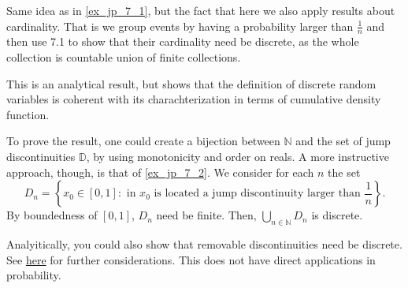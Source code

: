 \begin{my_ex}
	
\end{my_ex}
\begin{my_remark}
	\label{ex_jp_7_2}
	Same idea as in \ref{ex_jp_7_1}, but the fact that here we also apply results about cardinality. That is we group events by having a probability larger than $\frac{1}{n}$ and then use 7.1 to show that their cardinality need be discrete, as the whole collection is countable union of finite collections.
\end{my_remark}

\begin{my_ex}
	
\end{my_ex}
\begin{my_remark}
	This is an analytical result, but shows that the definition of discrete random variables is coherent with its charachterization in terms of cumulative density function. 
	
	To prove the result, one could create a bijection between $\mathbb{N}$ and the set of jump discontinuities $\mathbb{D}$, by using monotonicity and order on reals.
	A more instructive approach, though, is that of \ref{ex_jp_7_2}. We consider for each $n$ the set
	\[ 
		D_n = 
		\left\{
			x_0 \in [0,1] : 
			\text{ in } x_0 \text{ is located a jump discontinuity larger than } 
			\frac{1}{n}
		\right\}.
	\]
	By boundedness of $[0,1]$, $D_n$ need be finite. Then, $\bigcup_{n\in\mathbb{N}} D_n$ is discrete. 
	
	Analyitically, you could also show that removable discontinuities need be discrete. See \href{run:assets/removable_disc.pdf}{here} for further considerations. This does not have direct applications in probability.
\end{my_remark}